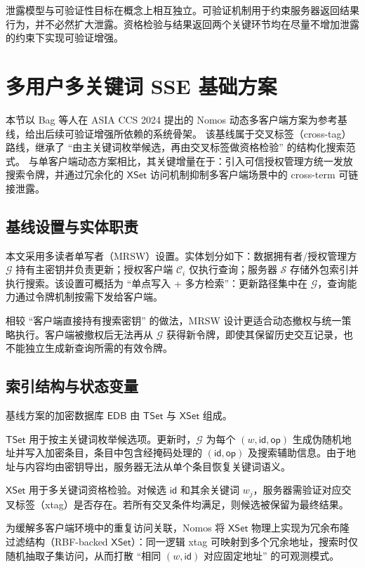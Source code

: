 泄露模型与可验证性目标在概念上相互独立。可验证机制用于约束服务器返回结果行为，并不必然扩大泄露。资格检验与结果返回两个关键环节均在尽量不增加泄露的约束下实现可验证增强。

\section{多用户多关键词 SSE 基础方案}
本节以 Bag 等人在 ASIA CCS 2024 提出的 Nomos 动态多客户端方案为参考基线，给出后续可验证增强所依赖的系统骨架。\cite{bag2024nomos} 该基线属于交叉标签（cross-tag）路线，继承了 ``由主关键词枚举候选，再由交叉标签做资格检验'' 的结构化搜索范式。\cite{cash2014} 与单客户端动态方案相比，其关键增量在于：引入可信授权管理方统一发放搜索令牌，并通过冗余化的 $\mathsf{XSet}$ 访问机制抑制多客户端场景中的 cross-term 可链接泄露。

\subsection{基线设置与实体职责}
本文采用多读者单写者（MRSW）设置。实体划分如下：数据拥有者/授权管理方 $\mathcal{G}$ 持有主密钥并负责更新；授权客户端 $\mathcal{C}_i$ 仅执行查询；服务器 $\mathcal{S}$ 存储外包索引并执行搜索。该设置可概括为 ``单点写入 + 多方检索''：更新路径集中在 $\mathcal{G}$，查询能力通过令牌机制按需下发给客户端。

相较 ``客户端直接持有搜索密钥'' 的做法，MRSW 设计更适合动态撤权与统一策略执行。客户端被撤权后无法再从 $\mathcal{G}$ 获得新令牌，即使其保留历史交互记录，也不能独立生成新查询所需的有效令牌。

\subsection{索引结构与状态变量}
基线方案的加密数据库 $\mathsf{EDB}$ 由 $\mathsf{TSet}$ 与 $\mathsf{XSet}$ 组成。

$\mathsf{TSet}$ 用于按主关键词枚举候选项。更新时，$\mathcal{G}$ 为每个 $(w,\mathsf{id},\mathsf{op})$ 生成伪随机地址并写入加密条目，条目中包含经掩码处理的 $(\mathsf{id},\mathsf{op})$ 及搜索辅助信息。由于地址与内容均由密钥导出，服务器无法从单个条目恢复关键词语义。

$\mathsf{XSet}$ 用于多关键词资格检验。对候选 $\mathsf{id}$ 和其余关键词 $w_j$，服务器需验证对应交叉标签（xtag）是否存在。若所有交叉条件均满足，则候选被保留为最终结果。

为缓解多客户端环境中的重复访问关联，Nomos 将 $\mathsf{XSet}$ 物理上实现为冗余布隆过滤结构（RBF-backed $\mathsf{XSet}$）：同一逻辑 xtag 可映射到多个冗余地址，搜索时仅随机抽取子集访问，从而打散 ``相同 $(w,\mathsf{id})$ 对应固定地址'' 的可观测模式。\cite{bag2024nomos}

